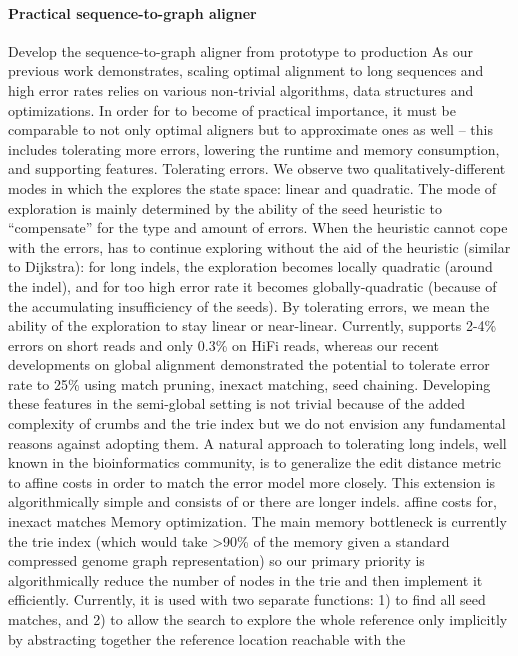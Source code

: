 \paragraph{Practical sequence-to-graph aligner}
Develop the \astarix sequence-to-graph aligner from prototype to production As
our previous work demonstrates, scaling optimal \A alignment to long sequences
and high error rates relies on various non-trivial algorithms, data structures
and optimizations. In order for \astarix to become of practical importance, it
must be comparable to not only optimal aligners but to approximate ones as well
– this includes tolerating more errors, lowering the runtime and memory
consumption, and supporting features. Tolerating errors. We observe two
qualitatively-different modes in which the \A explores the state space: linear
and quadratic. The mode of exploration is mainly determined by the ability of
the seed heuristic to “compensate” for the type and amount of errors. When the
heuristic cannot cope with the errors, \A has to continue exploring without the
aid of the heuristic (similar to Dijkstra): for long indels, the exploration
becomes locally quadratic (around the indel), and for too high error rate it
becomes globally-quadratic (because of the accumulating insufficiency of the
seeds). By tolerating errors, we mean the ability of the exploration to stay
linear or near-linear. Currently, \astarix supports 2-4\% errors on short reads
and only 0.3\% on HiFi reads, whereas our recent developments on global
alignment demonstrated the potential to tolerate error rate to 25\% using match
pruning, inexact matching, seed chaining. Developing these features in the
semi-global setting is not trivial because of the added complexity of crumbs and
the trie index but we do not envision any fundamental reasons against adopting
them. A natural approach to tolerating long indels, well known in the
bioinformatics community, is to generalize the edit distance metric to affine
costs in order to match the error model more closely. This extension is
algorithmically simple and consists of or there are longer indels. affine costs
for, inexact matches Memory optimization. The main memory bottleneck is
currently the trie index (which would take >90\% of the memory given a standard
compressed genome graph representation) so our primary priority is
algorithmically reduce the number of nodes in the trie and then implement it
efficiently. Currently, it is used with two separate functions: 1) to find all
seed matches, and 2) to allow the search \A to explore the whole reference only
implicitly by abstracting together the reference location reachable with the
